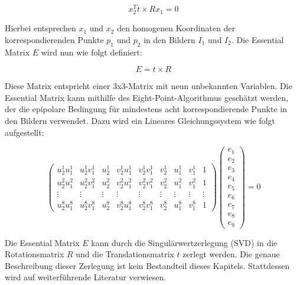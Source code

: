 \begin{equation}
    x_2^T t \times R x_1 = 0
\end{equation}

Hierbei entsprechen \( x_1 \) und \( x_2 \) den homogenen Koordinaten der korrespondierenden Punkte \( p_1 \) und \( p_2 \) in den Bildern \( I_1 \) und \( I_2 \). Die Essential Matrix \( E \) wird nun wie folgt definiert:

\begin{equation}
    E = t \times R
\end{equation}

Diese Matrix entspricht einer 3x3-Matrix mit neun unbekannten Variablen. Die Essential Matrix kann mithilfe des Eight-Point-Algorithmus geschätzt werden, der die epipolare Bedingung für mindestens acht korrespondierende Punkte in den Bildern verwendet. Dazu wird ein Lineares Gleichungssystem wie folgt aufgestellt: 

\begin{equation}
    \begin{pmatrix}
        u_2^1 u_1^1 & u_2^1 v_1^1 & u_2^1 & v_2^1 u_1^1 & v_2^1 v_1^1 & v_2^1 & u_1^1 & v_1^1 & 1 \\
        u_2^2 u_1^2 & u_2^2 v_1^2 & u_2^2 & v_2^2 u_1^2 & v_2^2 v_1^2 & v_2^2 & u_1^2 & v_1^2 & 1 \\
        \vdots & \vdots & \vdots & \vdots & \vdots & \vdots & \vdots & \vdots & \vdots \\
        u_2^8 u_1^8 & u_2^8 v_1^8 & u_2^8 & v_2^8 u_1^8 & v_2^8 v_1^8 & v_2^8 & u_1^8 & v_1^8 & 1 
    \end{pmatrix}
    \begin{pmatrix}
        e_1 \\ e_2 \\ e_3 \\ e_4 \\ e_5 \\ e_6 \\ e_7 \\ e_8 \\ e_9
    \end{pmatrix}
    = 0
\end{equation}

Die Essential Matrix \( E \) kann durch die Singulärwertzerlegung (SVD) in die Rotationsmatrix \( R \) und die Translationsmatrix \( t \) zerlegt werden. Die genaue Beschreibung dieser Zerlegung ist kein Bestandteil dieses Kapitels. Stattdessen wird auf weiterführende Literatur verwiesen.

